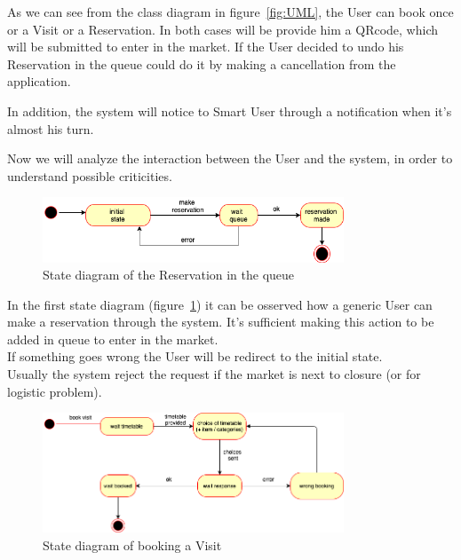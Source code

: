 \par 
\medskip
As we can see from the class diagram in figure~\ref{fig:UML}, the User can book once or a Visit or a Reservation.
In both cases will be provide him a QRcode, which will be submitted to enter in the market. 
If the User decided to undo his Reservation in the queue could do it by making a cancellation from the application. 
\par
\medskip

In addition, the system will notice to Smart User through a notification  when it's almost his turn.

Now we will analyze the interaction between the User and the system, in order to understand possible criticities.
\par 
\bigskip

\begin{figure}[h]
  \caption{State diagram of the Reservation in the queue}
  \label{fig:Reservation}
  \centering
  \includegraphics[width=0.8\textwidth, height=0.2\textwidth]{diagrams/2-reservation.png}

\end{figure}
\par 
\medskip

In the first state diagram (figure~\ref{fig:Reservation}) it can be osserved how a generic User can make a reservation through the system. It's sufficient making this action to be added in queue to enter in the market.
\\If something goes wrong the User will be redirect to the initial state.
\\Usually the system reject the request if the market is next to closure (or for logistic problem).

\par 
\medskip

\begin{figure}[h]
  \caption{State diagram of booking a Visit}
  \label{fig:Visit}
  \centering
  \includegraphics[width=0.8\textwidth, height=0.4\textwidth]{diagrams/2-visit.png}
\end{figure}

